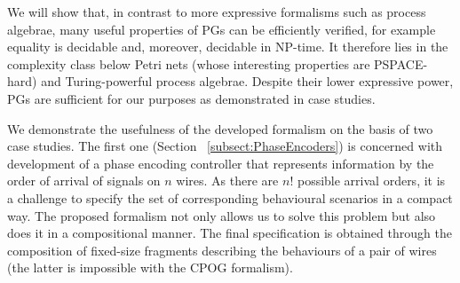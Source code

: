 %
%
%
%
%

We will show that, in contrast to more expressive formalisms such as process algebrae, many useful properties of PGs can be efficiently verified, for example equality is decidable and, moreover, decidable in NP-time.
It therefore lies in the complexity class below Petri nets (whose interesting properties are PSPACE-hard) and Turing-powerful process algebrae. Despite their lower expressive power, PGs are sufficient for our purposes as demonstrated in case studies.

We demonstrate the usefulness of the developed formalism on the basis of two case
studies. The first one (Section ~\ref{subsect:PhaseEncoders}) is concerned with development of a phase encoding
controller that represents information by the order of arrival of
signals on $n$ wires. As there are $n!$ possible arrival orders,
it is a challenge to specify the set of corresponding behavioural
scenarios in a compact way. The proposed formalism not only allows us
to solve this problem but also does it in a compositional manner. The final specification is obtained through the composition of fixed-size fragments
describing the behaviours of a pair of wires (the latter is impossible
with the CPOG formalism).





